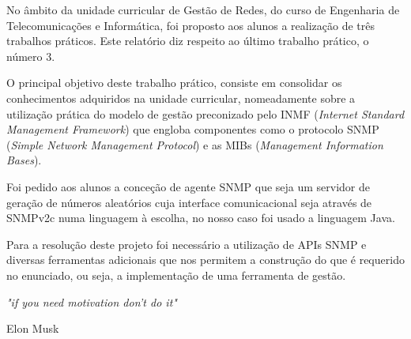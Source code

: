 \documentclass[../momento_1.tex]{subfiles}
\begin{document}
\par No âmbito da unidade curricular de Gestão de Redes, do curso de Engenharia de Telecomunicações e Informática, foi proposto aos alunos a realização de três trabalhos práticos. Este relatório diz respeito ao último trabalho prático, o número 3.\par
O principal objetivo deste trabalho prático, consiste em consolidar os conhecimentos adquiridos na unidade curricular, nomeadamente sobre a utilização prática do modelo de gestão
preconizado pelo INMF (\textit{Internet Standard Management Framework}) que engloba
componentes como o protocolo SNMP (\textit{Simple Network Management Protocol}) e as
MIBs (\textit{Management Information Bases}).\par
Foi pedido aos alunos a conceção de agente SNMP que seja um servidor de geração de números aleatórios cuja interface comunicacional seja através de SNMPv2c numa linguagem à escolha, no nosso caso foi usado a linguagem Java.\par
Para a resolução deste projeto foi necessário a utilização de APIs SNMP e diversas ferramentas adicionais que nos permitem a construção do que é requerido no enunciado, ou seja, a implementação de uma ferramenta de gestão.\\[2cm]



 
\setlength{\epigraphwidth}{4in} 
\epigraph{\textit{"if you need motivation don't do it"}}{Elon Musk}
\end{document}
